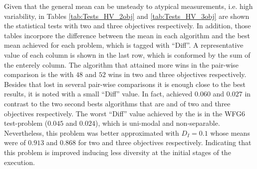 Given that the general mean can be unsteady to atypical measurements, i.e. high variability, in Tables \ref{tab:Tests_HV_2obj} and \ref{tab:Tests_HV_3obj} are shown the statistical tests with two and three objectives respectively.
%
In addition, those tables incorpore the difference between the mean in each algorithm and the best mean achieved for each problem, which is tagged with ``Diff''.
%
A representative value of each column is shown in the last row, which is conformed by the sum of the enterely column.
%
The algorithm that attained more wins in the pair-wise comparison is the \VSDMOEA{} with $48$ and $52$ wins in two and three objectives respectively.
%
Besides that \VSDMOEA{} lost in several pair-wise comparisons it is enough close to the best results, it is noted with a small ``Diff'' value.
%
In fact, \VSDMOEA{} achieved $0.060$ and $0.027$ in contrast to the two second bests algorithms that are \NSGAII{} and \RMOEA{} of two and three objectives respectively.
%
The worst ``Diff'' value achieved by the \VSDMOEA{} is in the WFG6 test-problem ($0.045$ and $0.024$), which is uni-modal and non-separable.
%
Nevertheless, this problem was better approximated with $D_I=0.1$ whose means were of $0.913$ and $0.868$ for two and three objectives respectively.
%
Indicating that this problem is improved inducing less diversity at the initial stages of the execution.
%

%

%
%

%
%
%
%
%
%
%
%
%


